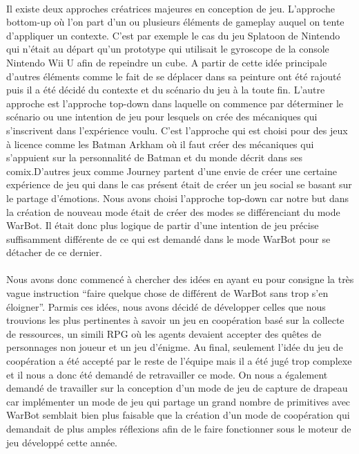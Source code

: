 \documentclass{report}
\begin{document}
\paragraph{}
  Il existe deux approches créatrices majeures en conception de jeu. L’approche bottom-up où l’on part d’un ou plusieurs éléments de gameplay auquel on tente d’appliquer un contexte. C’est par exemple le cas du jeu Splatoon de Nintendo qui n’était au départ qu’un prototype qui utilisait le gyroscope de la console Nintendo Wii U afin de repeindre un cube. A partir de cette idée principale d’autres éléments comme le fait de se déplacer dans sa peinture ont été rajouté puis il a été décidé du contexte et du scénario du jeu à la toute fin. \newline
L’autre approche est l’approche top-down dans laquelle on commence par déterminer le scénario ou une intention de jeu pour lesquels on crée des mécaniques qui s’inscrivent dans l’expérience voulu. C’est l’approche qui est choisi pour des jeux à licence comme les Batman Arkham où il faut créer des mécaniques qui s’appuient sur la personnalité de Batman et du monde décrit dans ses comix.D’autres jeux comme Journey partent d’une envie de créer une certaine expérience de jeu qui dans le cas présent était de créer un jeu social se basant sur le partage d’émotions. \newline
Nous avons choisi l’approche top-down car notre but dans la création de nouveau mode était de créer des modes se différenciant du mode WarBot. Il était donc plus logique de partir d’une intention de jeu précise suffisamment différente de ce qui est demandé dans le mode WarBot pour se détacher de ce dernier.
\paragraph{}

  Nous avons donc commencé à chercher des idées en ayant eu pour consigne la très vague instruction “faire quelque chose de différent de WarBot sans trop s’en éloigner”. Parmis ces idées, nous avons décidé de développer celles que nous trouvions les plus pertinentes à savoir un jeu en coopération basé sur la collecte de ressources, un simili RPG où les agents devaient accepter des quêtes de personnages non joueur et un jeu d’énigme. \newline
Au final, seulement l’idée du jeu de coopération a été accepté par le reste de l’équipe mais il a été jugé trop complexe et il nous a donc été demandé de retravailler ce mode. On nous a également demandé de travailler sur la conception d’un mode de jeu de capture de drapeau car implémenter un mode de jeu qui partage un grand nombre de primitives avec WarBot semblait bien plus faisable que la création d’un mode de coopération qui demandait de plus amples réflexions afin de le faire fonctionner sous le moteur de jeu développé cette année.
\end{document}
